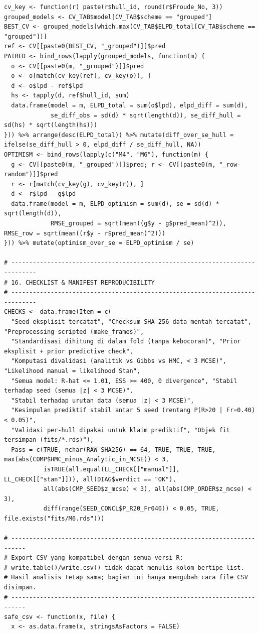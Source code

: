 \documentclass[
]{article}
\begin{document}
\begin{verbatim}
cv_key <- function(r) paste(r$hull_id, round(r$Froude_No, 3))
grouped_models <- CV_TAB$model[CV_TAB$scheme == "grouped"]
BEST_CV <- grouped_models[which.max(CV_TAB$ELPD_total[CV_TAB$scheme == "grouped"])]
ref <- CV[[paste0(BEST_CV, "_grouped")]]$pred
PAIRED <- bind_rows(lapply(grouped_models, function(m) {
  o <- CV[[paste0(m, "_grouped")]]$pred
  o <- o[match(cv_key(ref), cv_key(o)), ]
  d <- o$lpd - ref$lpd
  hs <- tapply(d, ref$hull_id, sum)
  data.frame(model = m, ELPD_total = sum(o$lpd), elpd_diff = sum(d),
             se_diff_obs = sd(d) * sqrt(length(d)), se_diff_hull = sd(hs) * sqrt(length(hs)))
})) %>% arrange(desc(ELPD_total)) %>% mutate(diff_over_se_hull = ifelse(se_diff_hull > 0, elpd_diff / se_diff_hull, NA))
OPTIMISM <- bind_rows(lapply(c("M4", "M6"), function(m) {
  g <- CV[[paste0(m, "_grouped")]]$pred; r <- CV[[paste0(m, "_row-random")]]$pred
  r <- r[match(cv_key(g), cv_key(r)), ]
  d <- r$lpd - g$lpd
  data.frame(model = m, ELPD_optimism = sum(d), se = sd(d) * sqrt(length(d)),
             RMSE_grouped = sqrt(mean((g$y - g$pred_mean)^2)), RMSE_row = sqrt(mean((r$y - r$pred_mean)^2)))
})) %>% mutate(optimism_over_se = ELPD_optimism / se)

# -----------------------------------------------------------------------------
# 16. CHECKLIST & MANIFEST REPRODUCIBILITY
# -----------------------------------------------------------------------------
CHECKS <- data.frame(Item = c(
  "Seed eksplisit tercatat", "Checksum SHA-256 data mentah tercatat", "Preprocessing scripted (make_frames)",
  "Standardisasi dihitung di dalam fold (tanpa kebocoran)", "Prior eksplisit + prior predictive check",
  "Komputasi divalidasi (analitik vs Gibbs vs HMC, < 3 MCSE)", "Likelihood manual = likelihood Stan",
  "Semua model: R-hat <= 1.01, ESS >= 400, 0 divergence", "Stabil terhadap seed (semua |z| < 3 MCSE)",
  "Stabil terhadap urutan data (semua |z| < 3 MCSE)",
  "Kesimpulan prediktif stabil antar 5 seed (rentang P(R>20 | Fr=0.40) < 0.05)",
  "Validasi per-hull dipakai untuk klaim prediktif", "Objek fit tersimpan (fits/*.rds)"),
  Pass = c(TRUE, nchar(RAW_SHA256) == 64, TRUE, TRUE, TRUE, max(abs(COMP$HMC_minus_Analytic_in_MCSE)) < 3,
           isTRUE(all.equal(LL_CHECK[["manual"]], LL_CHECK[["stan"]])), all(DIAG$verdict == "OK"),
           all(abs(CMP_SEED$z_mcse) < 3), all(abs(CMP_ORDER$z_mcse) < 3),
           diff(range(SEED_CONCL$P_R20_Fr040)) < 0.05, TRUE, file.exists("fits/M6.rds")))

# --------------------------------------------------------------------------
# Export CSV yang kompatibel dengan semua versi R:
# write.table()/write.csv() tidak dapat menulis kolom bertipe list.
# Hasil analisis tetap sama; bagian ini hanya mengubah cara file CSV disimpan.
# --------------------------------------------------------------------------
safe_csv <- function(x, file) {
  x <- as.data.frame(x, stringsAsFactors = FALSE)


\end{verbatim}
\end{document}
